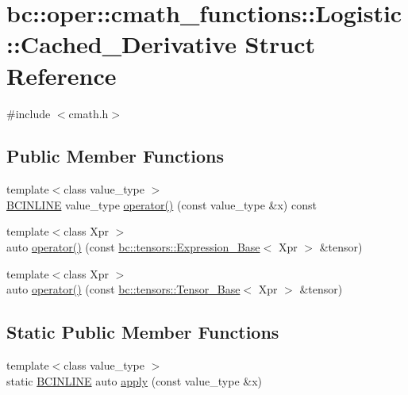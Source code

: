 \hypertarget{structbc_1_1oper_1_1cmath__functions_1_1Logistic_1_1Cached__Derivative}{}\section{bc\+:\+:oper\+:\+:cmath\+\_\+functions\+:\+:Logistic\+:\+:Cached\+\_\+\+Derivative Struct Reference}
\label{structbc_1_1oper_1_1cmath__functions_1_1Logistic_1_1Cached__Derivative}


{\ttfamily \#include $<$cmath.\+h$>$}

\subsection*{Public Member Functions}
\begin{DoxyCompactItemize}
\item 
{\footnotesize template$<$class value\+\_\+type $>$ }\\\hyperlink{common_8h_a6699e8b0449da5c0fafb878e59c1d4b1}{B\+C\+I\+N\+L\+I\+NE} value\+\_\+type \hyperlink{structbc_1_1oper_1_1cmath__functions_1_1Logistic_1_1Cached__Derivative_a4eefeca31bb977d74e7a8c7c515cba41}{operator()} (const value\+\_\+type \&x) const
\item 
{\footnotesize template$<$class Xpr $>$ }\\auto \hyperlink{structbc_1_1oper_1_1cmath__functions_1_1Logistic_1_1Cached__Derivative_a50b958d405f20f93c48b24d893725639}{operator()} (const \hyperlink{classbc_1_1tensors_1_1Expression__Base}{bc\+::tensors\+::\+Expression\+\_\+\+Base}$<$ Xpr $>$ \&tensor)
\item 
{\footnotesize template$<$class Xpr $>$ }\\auto \hyperlink{structbc_1_1oper_1_1cmath__functions_1_1Logistic_1_1Cached__Derivative_a9d66d8acd91df67473c99ffd1ef81dd7}{operator()} (const \hyperlink{classbc_1_1tensors_1_1Tensor__Base}{bc\+::tensors\+::\+Tensor\+\_\+\+Base}$<$ Xpr $>$ \&tensor)
\end{DoxyCompactItemize}
\subsection*{Static Public Member Functions}
\begin{DoxyCompactItemize}
\item 
{\footnotesize template$<$class value\+\_\+type $>$ }\\static \hyperlink{common_8h_a6699e8b0449da5c0fafb878e59c1d4b1}{B\+C\+I\+N\+L\+I\+NE} auto \hyperlink{structbc_1_1oper_1_1cmath__functions_1_1Logistic_1_1Cached__Derivative_ac33704aefa055646291073a511968a48}{apply} (const value\+\_\+type \&x)
\end{DoxyCompactItemize}


